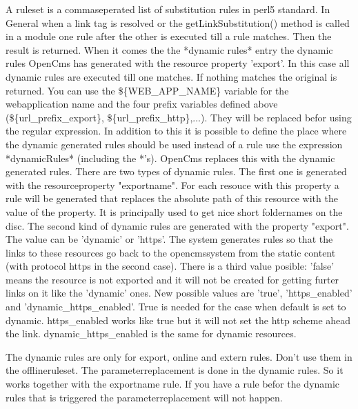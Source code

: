 A ruleset is a commaseperated list of substitution rules in perl5 standard. 
In General when a link tag is resolved or the getLinkSubstitution() method is called in a module one rule after the other is executed till a rule matches. Then the result is returned. When it comes the the *dynamic rules* entry the dynamic rules OpenCms has generated with the resource property 'export'. In this case all dynamic rules are executed till one matches. If nothing matches the original is returned. 
You can use the \$\{WEB\_APP\_NAME\} variable for the webapplication name and the
four prefix variables defined above (\$\{url\_prefix\_export\}, \$\{url\_prefix\_http\},...).
They will be replaced befor using the regular expression.
In addition to this it is possible to define the place where the dynamic
generated rules should be used instead of a rule use the expression 
*dynamicRules* (including the *'s). OpenCms replaces this with the dynamic
generated rules.
There are two types of dynamic rules. The first one is generated with the 
resourceproperty "exportname". For each resouce with this property a rule 
will be generated that replaces the absolute path of this resource with the 
value of the property. It is principally used to get nice short foldernames 
on the disc.
The second kind of dynamic rules are generated with the property "export".
The value can be 'dynamic' or 'https'. The system generates
rules so that the links to these resources go back to the opencmssystem from the 
static content (with protocol https in the second case).
There is a third value posible: 'false' means the resource is not exported and it 
will not be created for getting furter links on it like the 'dynamic' ones. 
New possible values are 'true', 'https\_enabled' and 'dynamic\_https\_enabled'. True 
is needed for the case when default is set to dynamic. https\_enabled works like true
but it will not set the http scheme ahead the link. dynamic\_https\_enabled is the same 
for dynamic resources.

The dynamic rules are only for export, online and extern rules. Don't use them in 
the offlineruleset.
The parameterreplacement is done in the dynamic rules. So it works together with
the exportname rule. If you have a rule befor the dynamic rules that is triggered
the parameterreplacement will not happen.
